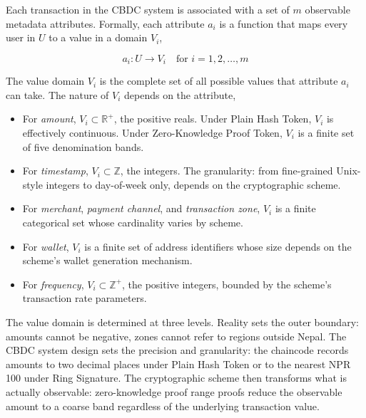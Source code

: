 Each transaction in the CBDC system is associated with a
set of $m$ observable metadata attributes. Formally, each
attribute $a_i$ is a function that maps every user in $U$
to a value in a domain $V_i$,

\begin{equation}
a_i : U \rightarrow V_i \quad \text{for } i = 1, 2, \ldots, m
\label{eq:attribute_function}
\end{equation}

The value domain $V_i$ is the complete set of all possible
values that attribute $a_i$ can take. The nature of $V_i$
depends on the attribute,

\begin{itemize}
    \item For \textit{amount}, $V_i \subset \mathbb{R}^+$,
    the positive reals. Under Plain Hash Token, $V_i$ is
    effectively continuous. Under Zero-Knowledge Proof Token, $V_i$ is a
    finite set of five denomination bands.

    \item For \textit{timestamp}, $V_i \subset \mathbb{Z}$,
the integers. The granularity: from fine-grained
Unix-style integers to day-of-week only, depends on
    the cryptographic scheme.

    \item For \textit{merchant}, \textit{payment channel},
    and \textit{transaction zone}, $V_i$ is a finite
    categorical set whose cardinality varies by scheme.

    \item For \textit{wallet}, $V_i$ is a finite set of
    address identifiers whose size depends on the scheme's
    wallet generation mechanism.

    \item For \textit{frequency}, $V_i \subset \mathbb{Z}^+$,
    the positive integers, bounded by the scheme's
    transaction rate parameters.
\end{itemize}

The value domain is determined at three levels. Reality sets
the outer boundary: amounts cannot be negative, zones cannot
refer to regions outside Nepal. The CBDC system design sets
the precision and granularity: the chaincode records amounts
to two decimal places under Plain Hash Token or to the
nearest NPR 100 under Ring Signature. The cryptographic
scheme then transforms what is actually observable: zero-knowledge proof range
proofs reduce the observable amount to a coarse band
regardless of the underlying transaction value.

